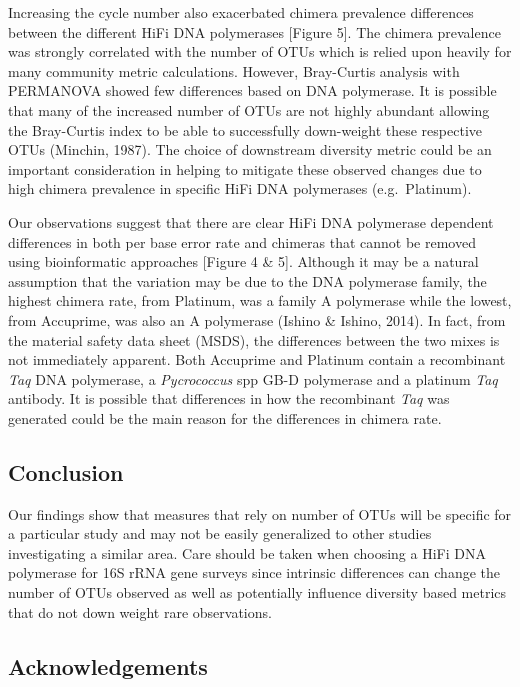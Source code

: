 \documentclass[12pt,]{article}
\begin{document}
Increasing the cycle number also exacerbated chimera prevalence
differences between the different HiFi DNA polymerases {[}Figure 5{]}.
The chimera prevalence was strongly correlated with the number of OTUs
which is relied upon heavily for many community metric calculations.
However, Bray-Curtis analysis with PERMANOVA showed few differences
based on DNA polymerase. It is possible that many of the increased
number of OTUs are not highly abundant allowing the Bray-Curtis index to
be able to successfully down-weight these respective OTUs (Minchin,
1987). The choice of downstream diversity metric could be an important
consideration in helping to mitigate these observed changes due to high
chimera prevalence in specific HiFi DNA polymerases (e.g.~Platinum).

Our observations suggest that there are clear HiFi DNA polymerase
dependent differences in both per base error rate and chimeras that
cannot be removed using bioinformatic approaches {[}Figure 4 \& 5{]}.
Although it may be a natural assumption that the variation may be due to
the DNA polymerase family, the highest chimera rate, from Platinum, was
a family A polymerase while the lowest, from Accuprime, was also an A
polymerase (Ishino \& Ishino, 2014). In fact, from the material safety
data sheet (MSDS), the differences between the two mixes is not
immediately apparent. Both Accuprime and Platinum contain a recombinant
\emph{Taq} DNA polymerase, a \emph{Pycrococcus} spp GB-D polymerase and
a platinum \emph{Taq} antibody. It is possible that differences in how
the recombinant \emph{Taq} was generated could be the main reason for
the differences in chimera rate.

\newpage

\subsection{Conclusion}\label{conclusion}

Our findings show that measures that rely on number of OTUs will be
specific for a particular study and may not be easily generalized to
other studies investigating a similar area. Care should be taken when
choosing a HiFi DNA polymerase for 16S rRNA gene surveys since intrinsic
differences can change the number of OTUs observed as well as
potentially influence diversity based metrics that do not down weight
rare observations.

\newpage

\subsection{Acknowledgements}\label{acknowledgements}
\end{document}
